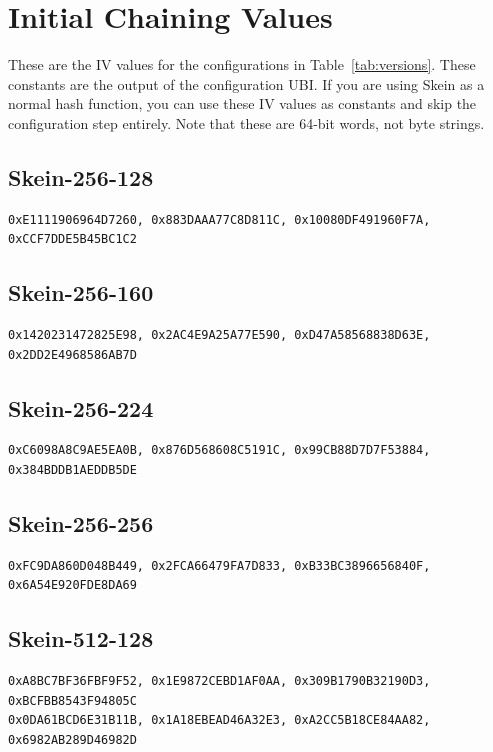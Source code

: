 \documentclass[11pt,twoside]{article}
\begin{document}
\section{Initial Chaining Values}\label{sec:initialchainingvalues}

These are the IV values for the configurations in Table~\ref{tab:versions}.  These constants are the output of the configuration UBI.  If you are using Skein as a normal hash function, you can use these IV values as constants and skip the configuration step entirely.  Note that these are 64-bit words, not byte strings.

\subsection{Skein-256-128}
\begin{verbatim}
0xE1111906964D7260, 0x883DAAA77C8D811C, 0x10080DF491960F7A, 0xCCF7DDE5B45BC1C2
\end{verbatim}

\subsection{Skein-256-160}
\begin{verbatim}
0x1420231472825E98, 0x2AC4E9A25A77E590, 0xD47A58568838D63E, 0x2DD2E4968586AB7D
\end{verbatim}

\subsection{Skein-256-224}
\begin{verbatim}
0xC6098A8C9AE5EA0B, 0x876D568608C5191C, 0x99CB88D7D7F53884, 0x384BDDB1AEDDB5DE
\end{verbatim}

\subsection{Skein-256-256}
\begin{verbatim}
0xFC9DA860D048B449, 0x2FCA66479FA7D833, 0xB33BC3896656840F, 0x6A54E920FDE8DA69
\end{verbatim}

\subsection{Skein-512-128}
\begin{verbatim}
0xA8BC7BF36FBF9F52, 0x1E9872CEBD1AF0AA, 0x309B1790B32190D3, 0xBCFBB8543F94805C
0x0DA61BCD6E31B11B, 0x1A18EBEAD46A32E3, 0xA2CC5B18CE84AA82, 0x6982AB289D46982D
\end{verbatim}
\end{document}
